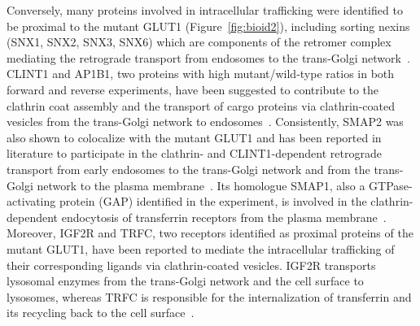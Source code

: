 Conversely, many proteins involved in intracellular trafficking were identified to be proximal to the mutant GLUT1 (Figure~\ref{fig:bioid2}), including sorting nexins (SNX1, SNX2, SNX3, SNX6) which are components of the retromer complex mediating the retrograde transport from endosomes to the trans-Golgi network~\cite{Rojas,Carlton,Mari,Harterink}. CLINT1 and AP1B1, two proteins with high mutant/wild-type ratios in both forward and reverse experiments, have been suggested to contribute to the clathrin coat assembly and the transport of cargo proteins via clathrin-coated vesicles from the trans-Golgi network to endosomes~\cite{McMahon,Mills,Kalthoff,Hirst}. 
Consistently, SMAP2 was also shown to colocalize with the mutant GLUT1 and has been reported in literature to participate in the clathrin- and CLINT1-dependent retrograde transport from early endosomes to the trans-Golgi network and from the trans-Golgi network to the plasma membrane~\cite{Natsume,Funaki}. Its homologue SMAP1, also a GTPase-activating protein (GAP) identified in the experiment, is involved in the clathrin-dependent endocytosis of transferrin receptors from the plasma membrane~\cite{Tanabe}. Moreover, IGF2R and TRFC, two receptors identified as proximal proteins of the mutant GLUT1, have been reported to mediate the intracellular trafficking of their corresponding ligands via clathrin-coated vesicles. IGF2R transports lysosomal enzymes from the trans-Golgi network and the cell surface to lysosomes, whereas TRFC is responsible for the internalization of transferrin and its recycling back to the cell surface~\cite{Byrd,Daro}. 


